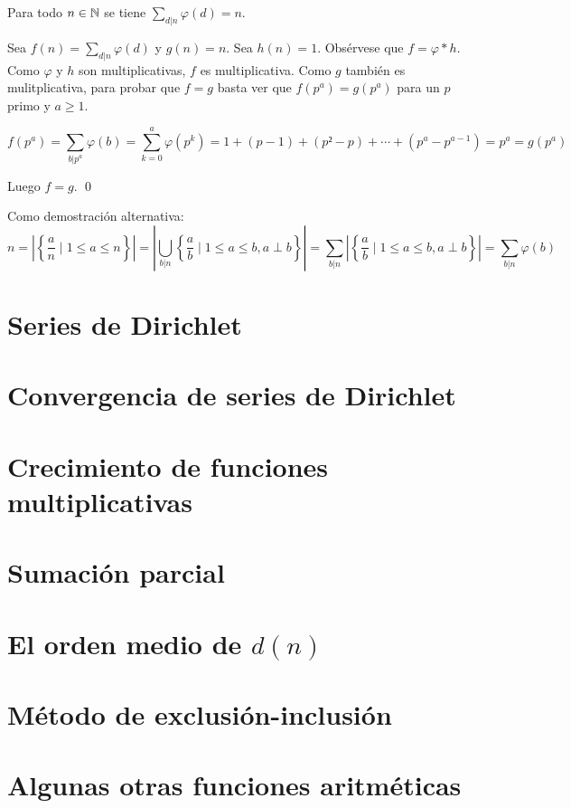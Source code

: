 \documentclass[TAN.tex]{subfiles}
\begin{document}
\begin{prop}
Para todo $n \in \mathbb{N}$ se tiene $\displaystyle\sum_{d|n} φ(d) = n$.
\end{prop}

\begin{dem}
Sea $f(n) = \sum_{d|n} φ(d)$ y $g(n) = n$. Sea $h(n) = 1$. Obsérvese que $f = φ * h$. Como $φ$ y $h$ son multiplicativas, $f$ es multiplicativa. Como $g$ también es mulitplicativa, para probar que $f = g$ basta ver que $f(p^a)=g(p^a)$ para un $p$ primo y $a ≥ 1$.

\[ f(p^a) = \sum_{b|p^a} φ(b) = \sum_{k=0}^a φ(p^k) = 1+(p-1)+(p²-p)+\cdots+(p^a-p^{a-1}) = p^a = g(p^a) \]

Luego $f = g$.
\qed

Como demostración alternativa:
\[ n = \left|\left\{\frac{a}{n} \mid 1 ≤ a ≤ n\right\}\right|
= \left|\bigcup_{b|n} \left\{\frac{a}{b} \mid 1≤a≤b, a \perp b\right\}\right|
= \sum_{b|n} \left|\left\{\frac{a}{b} \mid 1 ≤ a ≤ b, a \perp b\right\}\right|
= \sum_{b|n} φ(b) \]\QED
\end{dem}

\section{Series de Dirichlet}

\section{Convergencia de series de Dirichlet}

\section{Crecimiento de funciones multiplicativas}

\section{Sumación parcial}

\section{El orden medio de $d(n)$}

\section{Método de exclusión-inclusión}

\section{Algunas otras funciones aritméticas}
\end{document}
